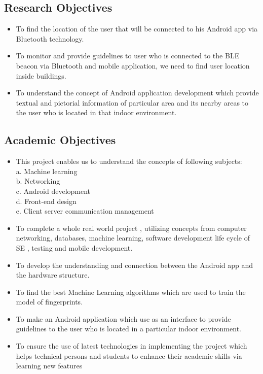 \documentclass{article}
\begin{document}
\subsection{Research Objectives}
\begin{itemize}
\item To find the location of the user that will be connected to his Android app via Bluetooth technology\cite{Introduction}.
\item To monitor and provide guidelines to user who is connected to the BLE beacon via Bluetooth and mobile application, we need to find user location inside buildings.
\item To understand the concept of Android application development which provide textual and pictorial information of particular area and its nearby areas to the user who is located in that indoor environment.


\end{itemize}
\subsection{Academic Objectives}
\begin{itemize}
\item This project enables us to understand the concepts of following subjects:
\\a.	Machine learning
\\b.	Networking
\\c.	Android development
\\d.	Front-end design
\\e.	Client server communication management
\item To complete a whole real world project , utilizing concepts from computer networking, databases, machine learning, software development life cycle of SE , testing and mobile development.
\item To develop the understanding and connection between the Android app and the hardware structure. 
\item To find the best Machine Learning algorithms which are used to train the model of fingerprints. 
\item To make an Android application which use as an interface to provide guidelines to the user who is located in a particular indoor environment.
\item To ensure the use of latest technologies in implementing the project which helps technical persons and students to enhance their academic skills via learning new features


\end{itemize}
\end{document}

